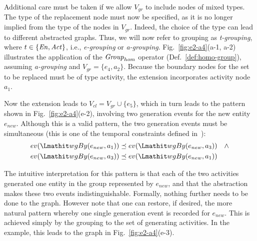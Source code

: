 Additional care must be taken if we allow $V_{gr}$ to include nodes of mixed types.  The type of the replacement node must now be specified, as it is no longer implied from the type of the nodes in $V_{gr}$. Indeed,  the choice of the type can lead to different abstracted graphs. Thus, we will now refer to grouping as \textit{t-grouping}, where $t \in \{ \mathit{En}, \mathit{Act}\}$, i.e., \textit{e-grouping} or \textit{a-grouping}. 
Fig.~\ref{fig:e2-a4}(a-1, a-2) illustrates the application of the $\mathit{Group}_{hom}$ operator (Def.~\ref{def:homo-group}), assuming \textit{a-grouping} and $V_{gr} = \{ e_4, a_2\}$. Because the boundary nodes for the set to be replaced must be of type activity, the extension incorporates activity node $a_1$.





%
Now the extension leads to $V_{cl} = V_{gr} \cup \{ e_5\}$, which in turn leads to the pattern shown in Fig.~\ref{fig:e2-a4}(e-2), involving two generation events for the new entity $e_{new}$.
Although this is a valid pattern, the two generation events must be simultaneous (this is one of the temporal constraints defined in~\citep{w3c-prov-constraints}):
\begin{align*}
ev(\wgby(e_{new}, a_1)) & \preorder ev(\wgby(e_{new}, a_3))  \quad \wedge \\
ev(\wgby(e_{new}, a_3)) & \preorder ev(\wgby(e_{new}, a_1))
\end{align*}

The intuitive interpretation for this pattern is that each of the two activities generated one entity in the group represented by $e_{new}$, and that the abstraction makes these two events indistinguishable.  Formally, nothing further needs to be done to the graph.   However note that one can restore, if desired, the more natural pattern whereby one single generation event is recorded for $e_{new}$. This is achieved simply by  the grouping to the set of generating activities.  In the example, this leads to the graph in Fig.~\ref{fig:e2-a4}(e-3).  

